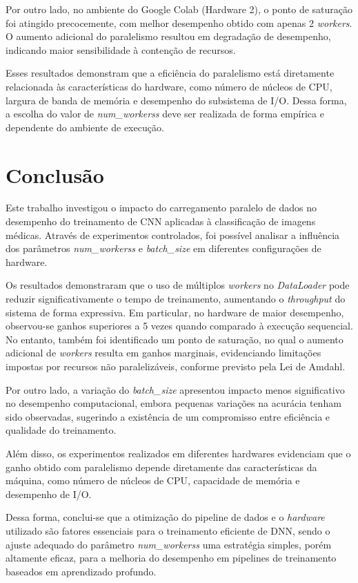 \documentclass[a4paper,11pt]{article}
\begin{document}
Por outro lado, no ambiente do Google Colab (Hardware 2), o ponto de saturação foi atingido precocemente, com melhor desempenho obtido com apenas 2 \textit{workers}. O aumento adicional do paralelismo resultou em degradação de desempenho, indicando maior sensibilidade à contenção de recursos.

Esses resultados demonstram que a eficiência do paralelismo está diretamente relacionada às características do hardware, como número de núcleos de CPU, largura de banda de memória e desempenho do subsistema de I/O. Dessa forma, a escolha do valor de \textit{num\_workerss} deve ser realizada de forma empírica e dependente do ambiente de execução.

\section{Conclusão}

Este trabalho investigou o impacto do carregamento paralelo de dados no desempenho do treinamento de CNN aplicadas à classificação de imagens médicas. Através de experimentos controlados, foi possível analisar a influência dos parâmetros \textit{num\_workerss} e \textit{batch\_size} em diferentes configurações de hardware.

Os resultados demonstraram que o uso de múltiplos \textit{workers} no \textit{DataLoader} pode reduzir significativamente o tempo de treinamento, aumentando o \textit{throughput} do sistema de forma expressiva. Em particular, no hardware de maior desempenho, observou-se ganhos superiores a 5 vezes quando comparado à execução sequencial. No entanto, também foi identificado um ponto de saturação, no qual o aumento adicional de \textit{workers} resulta em ganhos marginais, evidenciando limitações impostas por recursos não paralelizáveis, conforme previsto pela Lei de Amdahl.

Por outro lado, a variação do \textit{batch\_size} apresentou impacto menos significativo no desempenho computacional, embora pequenas variações na acurácia tenham sido observadas, sugerindo a existência de um compromisso entre eficiência e qualidade do treinamento.

Além disso, os experimentos realizados em diferentes hardwares evidenciam que o ganho obtido com paralelismo depende diretamente das características da máquina, como número de núcleos de CPU, capacidade de memória e desempenho de I/O.

Dessa forma, conclui-se que a otimização do pipeline de dados e o \textit{hardware} utilizado são fatores essenciais para o treinamento eficiente de DNN, sendo o ajuste adequado do parâmetro \textit{num\_workerss} uma estratégia simples, porém altamente eficaz, para a melhoria do desempenho em pipelines de treinamento baseados em aprendizado profundo.
\end{document}
